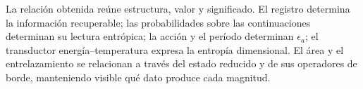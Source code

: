 La relación obtenida reúne estructura, valor y significado. El registro
determina la información recuperable; las probabilidades sobre las
continuaciones determinan su lectura entrópica; la acción y el período
determinan \(\epsilon_a\); el transductor energía--temperatura
expresa la entropía dimensional. El área y el entrelazamiento se
relacionan a través del estado reducido y de sus operadores de borde,
manteniendo visible qué dato produce cada magnitud.
